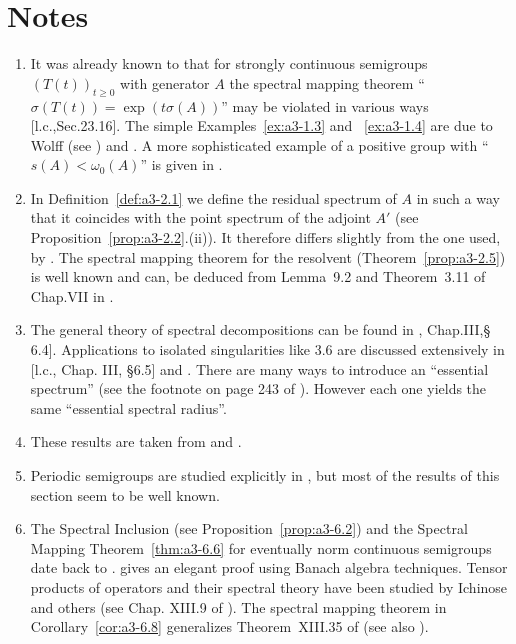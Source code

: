 \section*{Notes}\label{notes:a3-notes}
\begin{enumerate}[%
,label={\Large\emph{Section \arabic*:}}
, wide
, labelindent=0.0em
]
\item 
It was already known to \citet{hillephillips:1957} that for strongly continuous semigroups $(T(t))_{t\geq 0}$ with generator $A$ the spectral mapping theorem \enquote{$\sigma(T(t)) = \exp(t\sigma(A))$} may be violated in various ways [l.c.,Sec.23.16].
The simple Examples~\ref{ex:a3-1.3} and ~\ref{ex:a3-1.4} are due to Wolff (see \citet{greinervoigtwolff:1981}) and \citet{zabczyk:1975}.
A more sophisticated example of a positive group with 
\enquote{$s(A) < \omega_{0}(A)$} is given in \citet{wolff:1981}.

\item 
In Definition~\ref{def:a3-2.1} we define the residual spectrum of $A$ in such a way that it coincides with the point spectrum of the adjoint $A'$ (see Proposition~\ref{prop:a3-2.2}.(ii)).
It therefore differs slightly from the one used, \eg by \citet{schaefer:1974}.
The spectral mapping theorem for the resolvent (Theorem~\ref{prop:a3-2.5}) is well known and can, \eg be deduced from Lemma~9.2 and Theorem~3.11 of Chap.VII in \citet{dunfordschwartz:1958}.

\item 
The general theory of spectral decompositions can be found in \citet{kato:1966}, Chap.III,§ 6.4].
Applications to isolated singularities like 3.6 are discussed extensively in [l.c., Chap. III, §6.5] and \citet[Chap.VIII, Sec.8]{yosida:1965}.
There are many ways to introduce an \enquote{essential spectrum} (see the footnote on page 243 of \citet{kato:1966}).
However each one yields the same \enquote{essential spectral radius}.

\item 
These results are taken from \citet{derndinger:1980} and \citet{greiner:1981}.

\item 
Periodic semigroups are studied explicitly in \citet{bart:1977}, but most of the results of this section seem to be well known.

\item
The Spectral Inclusion (see Proposition~\ref{prop:a3-6.2}) and the Spectral Mapping Theorem~\ref{thm:a3-6.6} for eventually norm continuous semigroups date back to \citet{hillephillips:1957}.
\citet{davies:1980} gives an elegant proof using Banach algebra techniques.
Tensor products of operators and their spectral theory have been studied by Ichinose and others (see Chap. XIII.9 of \citet{reedsimon:1978}).
The spectral mapping theorem in Corollary~\ref{cor:a3-6.8} generalizes Theorem~XIII.35 of \citet{reedsimon:1978} (see also \citet{herbst:1982}).


\end{enumerate}
